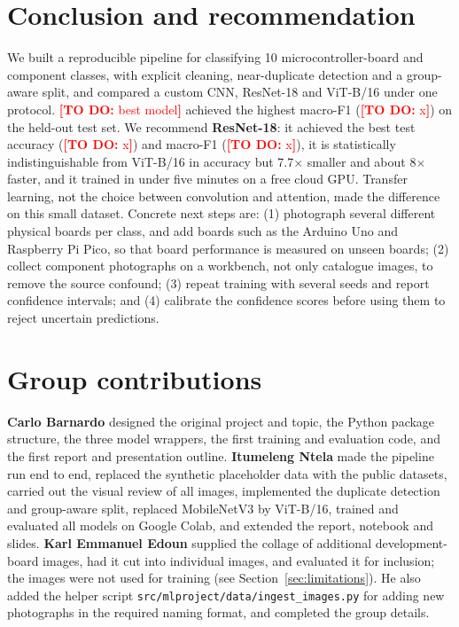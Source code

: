\documentclass[11pt,a4paper]{article}
\newcommand{\fillin}[1]{\textcolor{red}{\textbf{[TO DO:} #1\textbf{]}}}
\providecommand{\NumClasses}{10}
\providecommand{\BestModel}{\fillin{best model}}
\providecommand{\BestMacroF}{\fillin{x}}
\providecommand{\AccResnet}{\fillin{x}}\providecommand{\MacroFResnet}{\fillin{x}}
\begin{document}
\section{Conclusion and recommendation}\label{sec:conclusion}
We built a reproducible pipeline for classifying \NumClasses{} microcontroller-board and component classes, with explicit cleaning, near-duplicate detection and a group-aware split, and compared a custom CNN, ResNet-18 and ViT-B/16 under one protocol. \BestModel{} achieved the highest macro-F1 (\BestMacroF) on the held-out test set. We recommend \textbf{ResNet-18}: it achieved the best test accuracy (\AccResnet) and macro-F1 (\MacroFResnet), it is statistically indistinguishable from ViT-B/16 in accuracy but 7.7$\times$ smaller and about 8$\times$ faster, and it trained in under five minutes on a free cloud GPU. Transfer learning, not the choice between convolution and attention, made the difference on this small dataset. Concrete next steps are: (1) photograph several different physical boards per class, and add boards such as the Arduino Uno and Raspberry Pi Pico, so that board performance is measured on unseen boards; (2) collect component photographs on a workbench, not only catalogue images, to remove the source confound; (3) repeat training with several seeds and report confidence intervals; and (4) calibrate the confidence scores before using them to reject uncertain predictions.

\section*{Group contributions}
\textbf{Carlo Barnardo} designed the original project and topic, the Python package structure, the three model wrappers, the first training and evaluation code, and the first report and presentation outline. \textbf{Itumeleng Ntela} made the pipeline run end to end, replaced the synthetic placeholder data with the public datasets, carried out the visual review of all images, implemented the duplicate detection and group-aware split, replaced MobileNetV3 by ViT-B/16, trained and evaluated all models on Google Colab, and extended the report, notebook and slides. \textbf{Karl Emmanuel Edoun} supplied the collage of additional development-board images, had it cut into individual images, and evaluated it for inclusion; the images were not used for training (see Section~\ref{sec:limitations}). He also added the helper script \texttt{src/mlproject/data/ingest\_images.py} for adding new photographs in the required naming format, and completed the group details.
\end{document}
